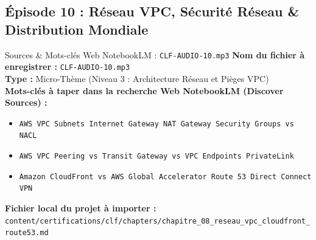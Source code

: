 \documentclass[11pt,a4paper]{article}
\begin{document}
\subsection{Épisode 10 : Réseau VPC, Sécurité Réseau \& Distribution Mondiale}
\begin{sourcebox}{Sources \& Mots-clés Web NotebookLM : \texttt{CLF-AUDIO-10.mp3}}
\textbf{Nom du fichier à enregistrer :} \texttt{CLF-AUDIO-10.mp3}\\
\textbf{Type :} Micro-Thème (Niveau 3 : Architecture Réseau et Pièges VPC)\\
\textbf{Mots-clés à taper dans la recherche Web NotebookLM (Discover Sources) :}
\begin{itemize}[noitemsep]
    \item \texttt{AWS VPC Subnets Internet Gateway NAT Gateway Security Groups vs NACL}
    \item \texttt{AWS VPC Peering vs Transit Gateway vs VPC Endpoints PrivateLink}
    \item \texttt{Amazon CloudFront vs AWS Global Accelerator Route 53 Direct Connect VPN}
\end{itemize}
\textbf{Fichier local du projet à importer :}
\texttt{content/certifications/clf/chapters/chapitre_08_reseau_vpc_cloudfront_route53.md}
\end{sourcebox}
\end{document}
